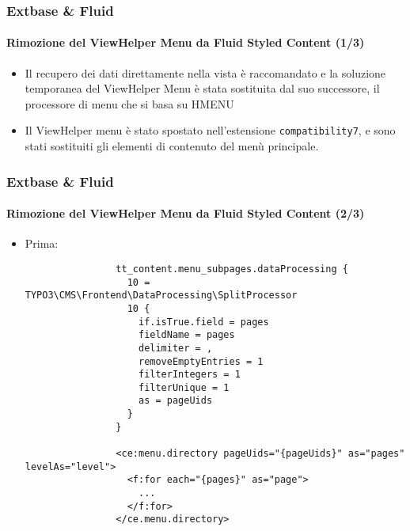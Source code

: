 \begin{frame}[fragile]
	\frametitle{Extbase \& Fluid}
	\framesubtitle{Rimozione del ViewHelper Menu da Fluid Styled Content (1/3)}

	\begin{itemize}
		\item Il recupero dei dati direttamente nella vista è raccomandato e la
			soluzione temporanea del ViewHelper Menu è stata sostituita dal suo successore,
			il processore di menu che si basa su HMENU

		\item Il ViewHelper menu è stato spostato nell'estensione \texttt{compatibility7},
			e sono stati sostituiti gli elementi di contenuto del menù principale.

	\end{itemize}

\end{frame}


\begin{frame}[fragile]
	\frametitle{Extbase \& Fluid}
	\framesubtitle{Rimozione del ViewHelper Menu da Fluid Styled Content (2/3)}

	\lstset{basicstyle=\tiny\ttfamily}

	\begin{itemize}

		\item Prima:

			\begin{lstlisting}
				tt_content.menu_subpages.dataProcessing {
				  10 = TYPO3\CMS\Frontend\DataProcessing\SplitProcessor
				  10 {
				    if.isTrue.field = pages
				    fieldName = pages
				    delimiter = ,
				    removeEmptyEntries = 1
				    filterIntegers = 1
				    filterUnique = 1
				    as = pageUids
				  }
				}

				<ce:menu.directory pageUids="{pageUids}" as="pages" levelAs="level">
				  <f:for each="{pages}" as="page">
				    ...
				  </f:for>
				</ce.menu.directory>
			\end{lstlisting}

	\end{itemize}

\end{frame}


